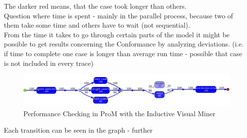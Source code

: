 \noindent The darker red means, that the case took longer than others.\\
Question where time is spent - mainly in the parallel process, because two of them take some time and others have to wait (not sequential).\\

From the time it takes to go through certain parts of the model it might be possible to get results concerning the Conformance by analyzing deviations. (i.e. if time to complete one case is longer than average run time - possible that case is not included in every trace)


\begin{figure} [H]
\includegraphics[width=14cm]{Chapters/Notizen_Graphics/InductiveVisualMiner_PerformanceAnalysis.jpg}
\caption{Performance Checking in ProM with the Inductive Visual Miner} 
\end{figure} 
Each transition can be seen in the graph - further 
 